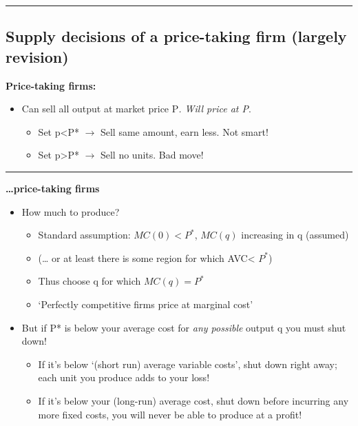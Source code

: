 \documentclass[]{article}
\providecommand{\tightlist}{%
  \setlength{\itemsep}{0pt}\setlength{\parskip}{0pt}}
\begin{document}
\begin{center}\rule{0.5\linewidth}{\linethickness}\end{center}

\hypertarget{supply-decisions-of-a-price-taking-firm-largely-revision}{%
\subsection{Supply decisions of a price-taking firm (largely revision)}\label{supply-decisions-of-a-price-taking-firm-largely-revision}}

\textbf{Price-taking firms:}

\begin{itemize}
\tightlist
\item
  Can sell all output at market price P\emph{. Will price at P}.

  \begin{itemize}
  \tightlist
  \item
    Set p\textless{}P* \(\rightarrow\) Sell same amount, earn less. Not smart!
  \item
    Set p\textgreater{}P* \(\rightarrow\) Sell no units. Bad move!
  \end{itemize}
\end{itemize}

\begin{center}\rule{0.5\linewidth}{\linethickness}\end{center}

\textbf{\ldots{}price-taking firms}

\begin{itemize}
\tightlist
\item
  How much to produce?

  \begin{itemize}
  \tightlist
  \item
    Standard assumption: \(MC(0)<P^*\), \(MC(q)\) increasing in q (assumed)
  \item
    (\ldots{} or at least there is some region for which AVC\textless{} \(P^*\))
  \item
    Thus choose q for which \(MC(q) = P^*\)
  \item
    `Perfectly competitive firms price at marginal cost'
  \end{itemize}
\item
  But if P* is below your average cost for \emph{any possible} output q you must shut down!

  \begin{itemize}
  \tightlist
  \item
    If it's below `(short run) average variable costs', shut down right away; each unit you produce adds to your loss!
  \item
    If it's below your (long-run) average cost, shut down before incurring any more fixed costs, you will never be able to produce at a profit!
  \end{itemize}
\end{itemize}
\end{document}
